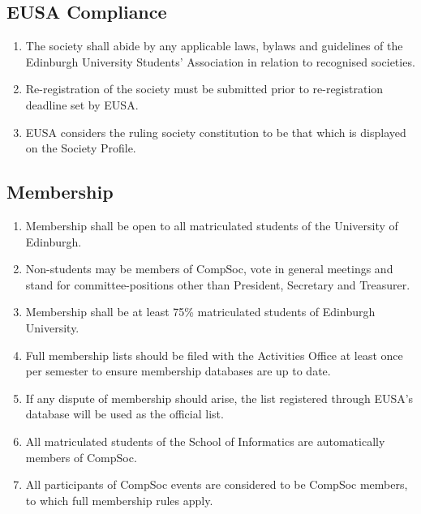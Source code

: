 \subsection{EUSA Compliance}

\begin{enumerate}
    \item The society shall abide by any applicable laws, bylaws and guidelines of the Edinburgh University Students' Association in relation to recognised societies.

    \item Re-registration of the society must be submitted prior to re-registration deadline set by EUSA\@.

    \item EUSA considers the ruling society constitution to be that which is displayed on the Society Profile.
\end{enumerate}

\subsection{Membership}

\begin{enumerate}
    \item Membership shall be open to all matriculated students of the University of Edinburgh.
    
    \item Non-students may be members of CompSoc, vote in general meetings and stand for committee-positions other than President, Secretary and Treasurer.
    
    \item Membership shall be at least 75\% matriculated students of Edinburgh University.

    \item Full membership lists should be filed with the Activities Office at least once per semester to ensure membership databases are up to date.
    
    \item If any dispute of membership should arise, the list registered through EUSA's database will be used as the official list.
    
    \item All matriculated students of the School of Informatics are automatically members of CompSoc.

    \item All participants of CompSoc events are considered to be CompSoc members, to which full membership rules apply.
\end{enumerate}

